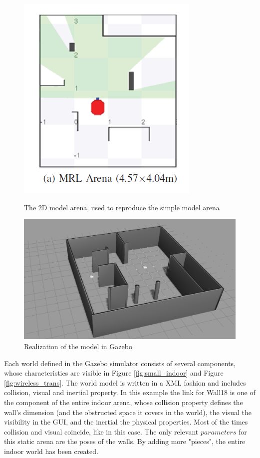 \documentclass[11pt,a4paper]{article}
\begin{document}
\begin{figure}[!htb]
    \centering
    \begin{minipage}{.5\textwidth}
        \centering
        \includegraphics[width=0.7\linewidth, height=0.2\textheight]{figures/MRL2d_arena}
        \caption{The 2D model arena, used to reproduce the simple model arena}
        \label{fig:2d_MRL}
    \end{minipage}%
    \begin{minipage}{0.5\textwidth}
        \centering
        \includegraphics[width=1\linewidth, height=0.2\textheight]{figures/Gazebo_indoor}
        \caption{Realization of the model in Gazebo}
        \label{fig:MRL_arena}
    \end{minipage}
 \end{figure}

Each world defined in the Gazebo simulator consists of several components, whose characteristics are visible in Figure \ref{fig:small_indoor} and Figure \ref{fig:wireless_trans}. The world model is written in a XML fashion and includes collision, visual and inertial property. In this example the link for Wall18 is one of the component of the entire indoor arena, whose collision property defines the wall's dimension (and the obstructed space it covers in the world), the visual the visibility in the GUI, and the inertial the physical properties. Most of the times collision and visual coincide, like in this case. The only relevant $parameters$ for this static arena are the poses of the walls. By adding more "pieces", the entire indoor world has been created. 
\end{document}
